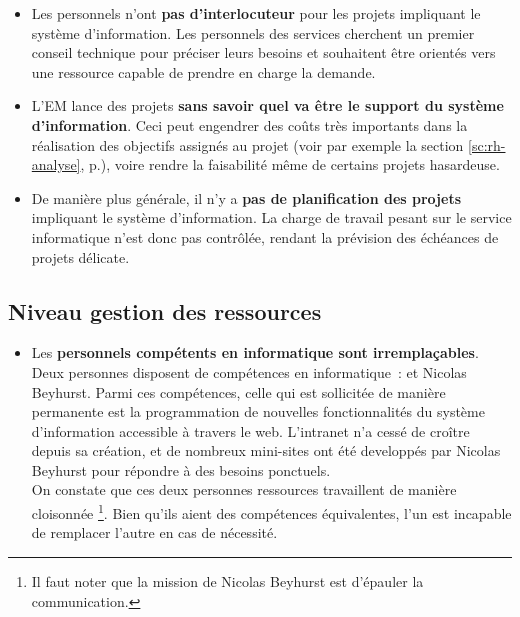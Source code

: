 \documentclass{book}
\begin{document}
\begin{itemize}
\item Les personnels n'ont \textbf{pas d'interlocuteur} pour les projets impliquant le système 
	d'information. Les personnels des services cherchent un premier conseil technique
	pour préciser leurs besoins et souhaitent être orientés vers une ressource
	capable de prendre en charge la demande.\\

\item L'EM lance des projets \textbf{sans savoir quel va être le support du système d'information}.
	Ceci peut engendrer des coûts très importants dans la réalisation des objectifs
	assignés au projet (voir par exemple la section \ref{sc:rh-analyse}, p.\pageref{sc:rh-analyse}),
	voire rendre la faisabilité même de certains projets hasardeuse.\\

\item De manière plus générale, il n'y a \textbf{pas de planification des projets} impliquant le 
	système d'information. La charge de travail pesant sur le service informatique n'est donc
	pas contrôlée, rendant la prévision des échéances de projets délicate.\\
\end{itemize}


\subsection{Niveau gestion des ressources}

\begin{itemize}
\item Les \textbf{personnels compétents en informatique sont irremplaçables}.
Deux personnes disposent de compétences en informatique~: \CK et Nicolas Beyhurst. Parmi
ces compétences, celle qui est sollicitée de manière permanente est la programmation
de nouvelles fonctionnalités du système d'information accessible à travers le web.
L'intranet n'a cessé de croître depuis sa création, et de nombreux mini-sites ont 
été developpés par Nicolas Beyhurst pour répondre à des besoins ponctuels.\\

On constate que ces deux personnes ressources travaillent de manière cloisonnée%
\footnote{Il faut noter que la mission de Nicolas Beyhurst est d'épauler la communication.}.
Bien qu'ils aient des compétences équivalentes, l'un est incapable de 
remplacer l'autre en cas de nécessité.
\end{itemize}
\end{document}
